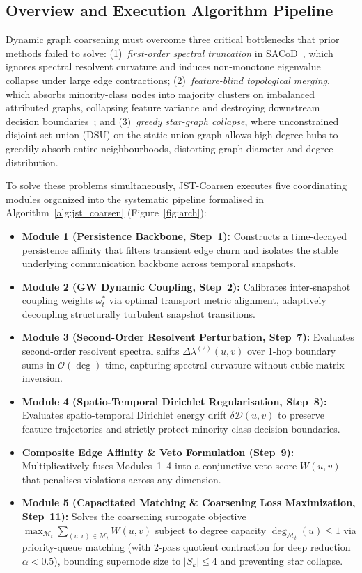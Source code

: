 \documentclass[sigconf]{acmart}
\begin{document}
\subsection{Overview and Execution Algorithm Pipeline}
\label{sec:overview}
Dynamic graph coarsening must overcome three critical bottlenecks that prior methods failed to solve: 
(1)~\textit{first-order spectral truncation} in SACoD~\cite{sacod2026}, which ignores spectral resolvent curvature and induces non-monotone eigenvalue collapse under large edge contractions; 
(2)~\textit{feature-blind topological merging}, which absorbs minority-class nodes into majority clusters on imbalanced attributed graphs, collapsing feature variance and destroying downstream decision boundaries~\cite{chamberlain2021grand,rusch2023survey}; and 
(3)~\textit{greedy star-graph collapse}, where unconstrained disjoint set union (DSU) on the static union graph allows high-degree hubs to greedily absorb entire neighbourhoods, distorting graph diameter and degree distribution.

To solve these problems simultaneously, JST-Coarsen executes five coordinating modules organized into the systematic pipeline formalised in Algorithm~\ref{alg:jst_coarsen} (Figure~\ref{fig:arch}):
\begin{itemize}
    \item \textbf{Module 1 (Persistence Backbone, Step~1):} Constructs a time-decayed persistence affinity that filters transient edge churn and isolates the stable underlying communication backbone across temporal snapshots.
    \item \textbf{Module 2 (GW Dynamic Coupling, Step~2):} Calibrates inter-snapshot coupling weights $\omega_t^*$ via optimal transport metric alignment, adaptively decoupling structurally turbulent snapshot transitions.
    \item \textbf{Module 3 (Second-Order Resolvent Perturbation, Step~7):} Evaluates second-order resolvent spectral shifts $\Delta \lambda^{(2)}(u, v)$ over 1-hop boundary sums in $\mathcal{O}(\operatorname{deg})$ time, capturing spectral curvature without cubic matrix inversion.
    \item \textbf{Module 4 (Spatio-Temporal Dirichlet Regularisation, Step~8):} Evaluates spatio-temporal Dirichlet energy drift $\delta \mathcal{D}(u, v)$ to preserve feature trajectories and strictly protect minority-class decision boundaries.
    \item \textbf{Composite Edge Affinity \& Veto Formulation (Step~9):} Multiplicatively fuses Modules~1--4 into a conjunctive veto score $W(u, v)$ that penalises violations across any dimension.
    \item \textbf{Module 5 (Capacitated Matching \& Coarsening Loss Maximization, Step~11):} Solves the coarsening surrogate objective $\max_{\mathcal{M}_t} \sum_{(u, v) \in \mathcal{M}_t} W(u, v)$ subject to degree capacity $\operatorname{deg}_{\mathcal{M}_t}(u) \le 1$ via priority-queue matching (with 2-pass quotient contraction for deep reduction $\alpha < 0.5$), bounding supernode size to $|S_k| \le 4$ and preventing star collapse.
\end{itemize}
\end{document}
